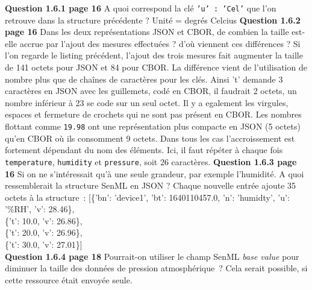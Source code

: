 \textbf {Question 1.6.1{} page 16} {} 
A quoi correspond la clé \texttt {'u' : 'Cel'} que l'on retrouve dans la structure précédente ? \vspace {1em}\newline 
Unité = degrés Celcius\newline \newline 
\textbf {Question 1.6.2{} page 16} {} 
Dans les deux représentations JSON et CBOR, de combien la taille est-elle accrue par l'ajout des mesures effectuées ? d'où viennent ces différences ?\vspace {1em}\newline 
 Si l'on regarde le listing précédent, l'ajout des trois mesures fait augmenter la taille de 141 octets pour JSON et 84 pour CBOR. La différence vient de l'utilisation de nombre plus que de chaînes de caractères pour les clés. Ainsi 't' demande 3 caractères en JSON avec les guillemets, codé en CBOR, il faudrait 2 octets, un nombre inférieur à 23 se code sur un seul octet. Il y a egalement les virgules, espaces et fermeture de crochets qui ne sont pas présent en CBOR. Les nombres flottant comme \texttt {19.98} ont une représentation plus compacte en JSON (5 octets) qu'en CBOR où ils consomment 9 octets. Dans tous les cas l'accroissement est fortement dépendant du nom des éléments. Ici, il faut répéter à chaque fois \texttt {temperature}, \texttt {humidity} et \texttt {pressure}, soit 26 caractères. \newline \newline 
\textbf {Question 1.6.3{} page 16} {} 
Si on ne s'intéressait qu'à une seule grandeur, par exemple l'humidité. A quoi ressemblerait la structure SenML en JSON ?\vspace {1em}\newline 
 Chaque nouvelle entrée ajoute 35 octets à la structure~: [\{'bn': 'device1', 'bt': 1640110457.0, 'n': 'humidty', 'u': '\%RH', 'v': 28.46\},\\ \{'t': 10.0, 'v': 26.86\},\\ \{'t': 20.0, 'v': 26.96\},\\ \{'t': 30.0, 'v': 27.01\}]\\ \newline \newline 
\textbf {Question 1.6.4{} page 18} {} 
 Pourrait-on utiliser le champ SenML \textit {base value} pour diminuer la taille des données de pression atmosphérique~? \vspace {1em}\newline 
 Cela serait possible, si cette ressource était envoyée seule. \newline \newline 
